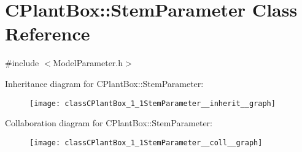 \hypertarget{classCPlantBox_1_1StemParameter}{}\section{C\+Plant\+Box\+:\+:Stem\+Parameter Class Reference}
\label{classCPlantBox_1_1StemParameter}


{\ttfamily \#include $<$Model\+Parameter.\+h$>$}



Inheritance diagram for C\+Plant\+Box\+:\+:Stem\+Parameter\+:\nopagebreak
\begin{figure}[H]
\begin{center}
\leavevmode
\texttt{[image: classCPlantBox\_1\_1StemParameter\_\_inherit\_\_graph]}
\end{center}
\end{figure}


Collaboration diagram for C\+Plant\+Box\+:\+:Stem\+Parameter\+:\nopagebreak
\begin{figure}[H]
\begin{center}
\leavevmode
\texttt{[image: classCPlantBox\_1\_1StemParameter\_\_coll\_\_graph]}
\end{center}
\end{figure}

